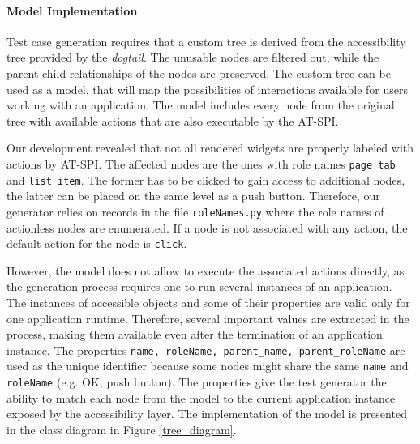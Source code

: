 \paragraph{Model Implementation} Test case generation requires that a custom tree is derived from the accessibility tree provided by the \textit{dogtail}. The unusable nodes are filtered out, while the parent-child relationships of the nodes are preserved. The custom tree can be used as a model, that will map the possibilities of interactions available for users working with an application. The model includes every node from the original tree with available actions that are also executable by the AT-SPI.

Our development revealed that not all rendered widgets are properly labeled with actions by AT-SPI. The affected nodes are the ones with role names \texttt{page tab} and \texttt{list item}. The former has to be clicked to gain access to additional nodes, the latter can be placed on the same level as a push button. Therefore, our generator relies on records in the file \texttt{roleNames.py} where the role names of actionless nodes are enumerated. If a node is not associated with any action, the default action for the node is \texttt{click}.

However, the model does not allow to execute the associated actions directly, as the generation process requires one to run several instances of an application. The instances of accessible objects and some of their properties are valid only for one application runtime. Therefore, several important values are extracted in the process, making them available even after the termination of an application instance. The properties \texttt{name, roleName, parent\_name, parent\_roleName} are used as the unique identifier because some nodes might share the same \texttt{name} and \texttt{roleName} (e.g. OK, push button). The properties give the test generator the ability to match each node from the model to the current application instance exposed by the accessibility layer. The implementation of the model is presented in the class diagram in Figure \ref{tree_diagram}.

